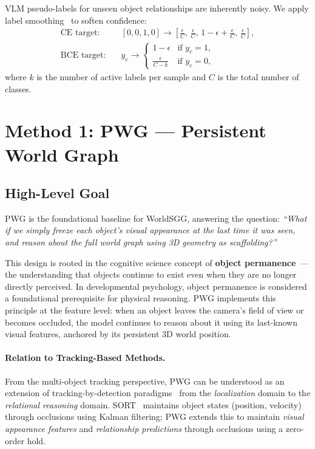 \documentclass[runningheads]{llncs}
\begin{document}
VLM pseudo-labels for unseen object relationships are inherently noisy.  We apply label smoothing~\cite{szegedy2016rethinking} to soften confidence:
\begin{align}
    \text{CE target:} &\quad [0,0,1,0] \to [\tfrac{\epsilon}{C},\,\tfrac{\epsilon}{C},\,1{-}\epsilon{+}\tfrac{\epsilon}{C},\,\tfrac{\epsilon}{C}], \label{eq:smooth_ce} \\
    \text{BCE target:} &\quad y_c \to \begin{cases} 1 - \epsilon & \text{if } y_c = 1, \\ \frac{\epsilon}{C - k} & \text{if } y_c = 0, \end{cases} \label{eq:smooth_bce}
\end{align}
where $k$ is the number of active labels per sample and $C$ is the total number of classes.


\section{Method 1: PWG --- Persistent World Graph}
\label{sec:pwg}

\subsection{High-Level Goal}

PWG is the foundational baseline for WorldSGG, answering the question: \emph{``What if we simply freeze each object's visual appearance at the last time it was seen, and reason about the full world graph using 3D geometry as scaffolding?''}

This design is rooted in the cognitive science concept of \textbf{object permanence}~\cite{piloto2022intuitive,spelke1990principles}---the understanding that objects continue to exist even when they are no longer directly perceived.  In developmental psychology, object permanence is considered a foundational prerequisite for physical reasoning.  PWG implements this principle at the feature level: when an object leaves the camera's field of view or becomes occluded, the model continues to reason about it using its last-known visual features, anchored by its persistent 3D world position.

\paragraph{Relation to Tracking-Based Methods.}  From the multi-object tracking perspective, PWG can be understood as an extension of tracking-by-detection paradigms~\cite{bewley2016sort,wojke2017simple} from the \emph{localization} domain to the \emph{relational reasoning} domain.  SORT~\cite{bewley2016sort} maintains object states (position, velocity) through occlusions using Kalman filtering; PWG extends this to maintain \emph{visual appearance features} and \emph{relationship predictions} through occlusions using a zero-order hold.
\end{document}
